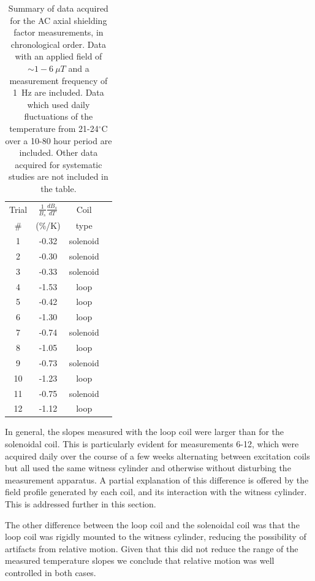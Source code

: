 \begin{table}
\begin{center}
\begin{tabular}{cccc}\hline
Trial & $\frac{1}{B_s}\frac{dB_s}{dT}$ & Coil \\
\#    & (\%/K) & type \\\hline
 1 & -0.32 & solenoid \\
 2 & -0.30 & solenoid \\
 3 & -0.33 & solenoid \\
 4 & -1.53 & loop \\
 5 & -0.42 & loop \\
 6 & -1.30 & loop \\
 7 & -0.74 & solenoid \\
 8 & -1.05 & loop \\
 9 & -0.73 & solenoid \\
10 & -1.23 & loop \\
11 & -0.75 & solenoid \\
12 & -1.12 & loop \\\hline
\end{tabular}
\caption[Summary of the AC axial shielding factor
measurements]{Summary of data acquired for the AC axial shielding
  factor measurements, in chronological order.  Data with an applied
  field of $\sim 1-6~\mu T$ and a measurement frequency of 1~Hz are
  included.  Data which used daily fluctuations of the temperature
  from 21-24$^\circ$C over a 10-80 hour period are included.  Other
  data acquired for systematic studies are not included in the
  table.\label{tab:axial}}
\end{center}
\end{table}

In general, the slopes measured with the loop coil were larger than
for the solenoidal coil.  This is particularly evident for
measurements 6-12, which were acquired daily over the course of a few
weeks alternating between excitation coils but all used the same
witness cylinder and otherwise without disturbing the measurement
apparatus.  A partial explanation of this difference is offered by the
field profile generated by each coil, and its interaction with the
witness cylinder.  This is addressed further in this section.

The other difference between the loop coil and the solenoidal coil was
that the loop coil was rigidly mounted to the witness cylinder,
reducing the possibility of artifacts from relative motion.  Given
that this did not reduce the range of the measured temperature slopes
we conclude that relative motion was well controlled in both cases.

